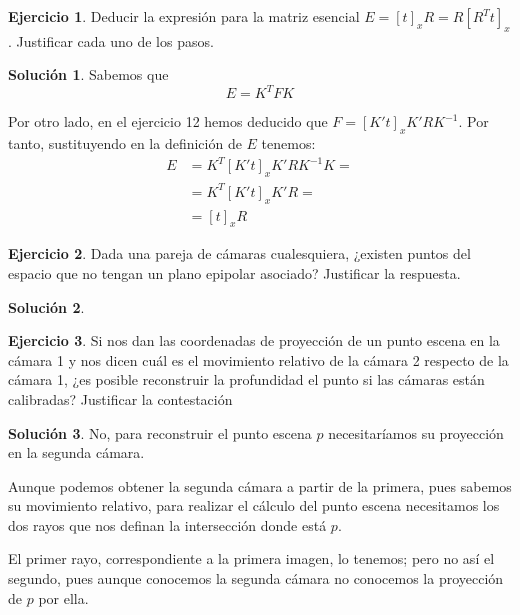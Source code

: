 \documentclass[a4paper, 11pt]{article}
\theoremstyle{definition}
\newtheorem{ejercicio}{Ejercicio}
\newtheorem*{solucion}{Solución}
\theoremstyle{theorem}
\begin{document}
    \begin{ejercicio}
        Deducir la expresión para la matriz esencial $E = [t]_x R = R[R^Tt]_x$. Justificar cada uno de los pasos.
    \end{ejercicio}

    \begin{solucion}
        Sabemos que
        \[
        E = K^T F K
        \]

        Por otro lado, en el ejercicio 12 hemos deducido que $F = [K't]_xK'RK^{-1}$. Por tanto, sustituyendo en la definición de $E$ tenemos:
        \begin{align*}
            E &= K^T [K't]_xK'RK^{-1} K = \\
            &= K^T [K't]_xK'R =\\
            &= [t]_x R
        \end{align*}
    \end{solucion}

    \begin{ejercicio}
        Dada una pareja de cámaras cualesquiera, ¿existen puntos del espacio que no tengan un plano epipolar asociado? Justificar la respuesta.
    \end{ejercicio}

    \begin{solucion}

    \end{solucion}

    \begin{ejercicio}
        Si nos dan las coordenadas de proyección de un punto escena en la cámara 1 y nos dicen cuál es el movimiento relativo de la cámara 2 respecto de la cámara 1, ¿es posible reconstruir la profundidad el punto si las cámaras están calibradas? Justificar la contestación
    \end{ejercicio}

    \begin{solucion}
        No, para reconstruir el punto escena $p$ necesitaríamos su proyección en la segunda cámara.

        Aunque podemos obtener la segunda cámara a partir de la primera, pues sabemos su movimiento relativo, para realizar el cálculo del punto escena necesitamos los dos rayos que nos definan la intersección donde está $p$.

        El primer rayo, correspondiente a la primera imagen, lo tenemos; pero no así el segundo, pues aunque conocemos la segunda cámara no conocemos la proyección de $p$ por ella.
    \end{solucion}
\end{document}
